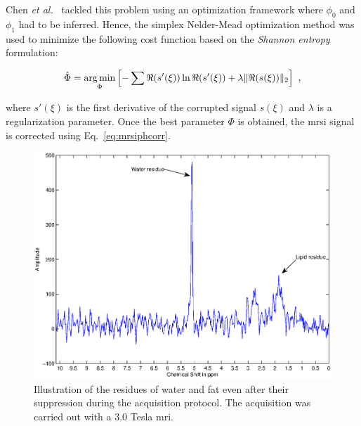 Chen \textit{et al.}~\cite{Chen2002} tackled this problem using an optimization framework where $\phi_0$ and $\phi_1$ had to be inferred.
Hence, the simplex Nelder-Mead optimization method was used to minimize the following cost function based on the \textit{Shannon entropy} formulation:

\begin{equation}
	\hat{\Phi} = \argmin_{\Phi} \left[ - \sum \Re(s'(\xi)) \ln \Re(s'(\xi)) + \lambda \|\Re(s(\xi))\|_2 \right] \ ,
	\label{eq:phcost}
\end{equation}

\noindent where $s'(\xi)$ is the first derivative of the corrupted signal $s(\xi)$ and $\lambda$ is a regularization parameter.
Once the best parameter $\Phi$ is obtained, the \ac{mrsi} signal is corrected using Eq.~\eqref{eq:mrsiphcorr}.

\begin{figure}
\centering
	\includegraphics[width=0.7\linewidth]{3_review/figures/processing/pre-processing/water/water_fat.eps}
	\caption[Illustration of water and fat residues in \ac{mrsi} signal after supression during acquisition.]{Illustration of the residues of water and fat even after their suppression during the acquisition protocol. The acquisition was carried out with a 3.0 Tesla \ac{mri}.}
	\label{fig:waterfat}
\end{figure}

